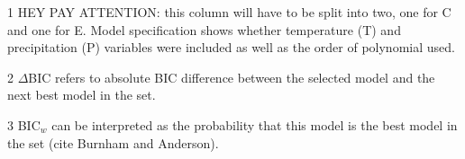 \begin{table}[tb]
\begin{threeparttable}
\begin{tabular}{llllll}
\bottomrule
\end{tabular}
\begin{tablenotes}
\item [1] HEY PAY ATTENTION: this column will have to be split into two, one for C and one for E. Model specification shows whether temperature (T) and precipitation (P) variables were included as well as the order of polynomial used.
\item [2] $\Delta$BIC refers to absolute BIC difference between the selected model and the next best model in the set.
\item [3] BIC$_w$ can be interpreted as the probability that this model is the best model in the set (cite Burnham and Anderson).
\end{tablenotes}
\end{threeparttable}
\end{table}


